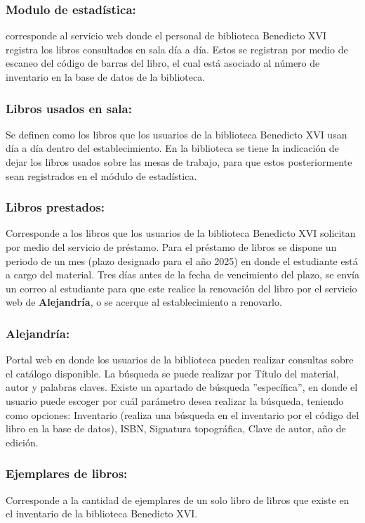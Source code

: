 \documentclass[spanish]{ieee_upb}
\begin{document}
    \subsubsection{Modulo de estadística: } corresponde al servicio web donde el personal de biblioteca Benedicto XVI registra los libros consultados en sala día a día. Estos se registran por medio de escaneo del código de barras del libro, el cual está asociado al número de inventario en la base de datos de la biblioteca.

    \subsubsection{Libros usados en sala: } Se definen como los libros que los usuarios de la biblioteca Benedicto XVI usan día a día dentro del establecimiento. En la biblioteca se tiene la indicación de dejar los libros usados sobre las mesas de trabajo, para que estos posteriormente sean registrados en el módulo de estadística.
    
    \subsubsection{Libros prestados: }Corresponde a los libros que los usuarios de la biblioteca Benedicto XVI solicitan por medio del servicio de préstamo. Para el préstamo de libros se dispone un periodo de un mes (plazo designado para el año 2025) en donde el estudiante está a cargo del material. Tres días antes de la fecha de vencimiento del plazo, se envía un correo al estudiante para que este realice la renovación del libro por el servicio web de \textbf{Alejandría}, o se acerque al establecimiento a renovarlo. 

    
    \subsubsection{Alejandría: }Portal web en donde los usuarios de la biblioteca pueden realizar consultas sobre el catálogo disponible. La búsqueda se puede realizar por Título del material, autor y palabras claves. Existe un apartado de búsqueda ''específica'', en donde el usuario puede escoger por cuál parámetro desea realizar la búsqueda, teniendo como opciones: Inventario (realiza una búsqueda en el inventario por el código del libro en la base de datos), ISBN, Signatura topográfica, Clave de autor, año de edición.
    
    \subsubsection{Ejemplares de libros: } Corresponde a la cantidad de ejemplares de un solo libro de libros que existe en el inventario de la biblioteca Benedicto XVI.
\end{document}
